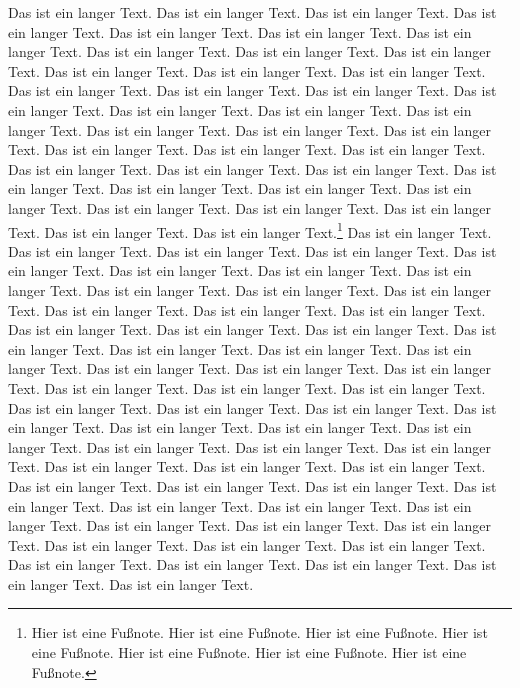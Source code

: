 \documentclass[twoside]{article}
\begin{document}
Das ist ein langer Text. Das ist ein langer Text.
Das ist ein langer Text. Das ist ein langer Text.
Das ist ein langer Text. Das ist ein langer Text.
Das ist ein langer Text. Das ist ein langer Text.
Das ist ein langer Text. Das ist ein langer Text.
Das ist ein langer Text. Das ist ein langer Text.
Das ist ein langer Text. Das ist ein langer Text.
Das ist ein langer Text. Das ist ein langer Text.
Das ist ein langer Text. Das ist ein langer Text.
Das ist ein langer Text. Das ist ein langer Text.
Das ist ein langer Text. Das ist ein langer Text.
Das ist ein langer Text. Das ist ein langer Text.
Das ist ein langer Text. Das ist ein langer Text.
Das ist ein langer Text. Das ist ein langer Text.
Das ist ein langer Text. Das ist ein langer Text.
Das ist ein langer Text. Das ist ein langer Text.
Das ist ein langer Text. Das ist ein langer Text.
Das ist ein langer Text. Das ist ein langer Text.
Das ist ein langer Text. Das ist ein langer Text.\footnote{%
  Hier ist eine Fu\ss note. Hier ist eine Fu\ss note.
  Hier ist eine Fu\ss note. Hier ist eine Fu\ss note.
  Hier ist eine Fu\ss note. Hier ist eine Fu\ss note.
  Hier ist eine Fu\ss note.}
Das ist ein langer Text. Das ist ein langer Text.
Das ist ein langer Text. Das ist ein langer Text.
Das ist ein langer Text. Das ist ein langer Text.
Das ist ein langer Text. Das ist ein langer Text.
Das ist ein langer Text. Das ist ein langer Text.
Das ist ein langer Text. Das ist ein langer Text.
Das ist ein langer Text. Das ist ein langer Text.
Das ist ein langer Text. Das ist ein langer Text.
Das ist ein langer Text. Das ist ein langer Text.
Das ist ein langer Text. Das ist ein langer Text.
Das ist ein langer Text. Das ist ein langer Text.
Das ist ein langer Text. Das ist ein langer Text.
Das ist ein langer Text. Das ist ein langer Text.
Das ist ein langer Text. Das ist ein langer Text.
Das ist ein langer Text. Das ist ein langer Text.
Das ist ein langer Text. Das ist ein langer Text.
Das ist ein langer Text. Das ist ein langer Text.
Das ist ein langer Text. Das ist ein langer Text.
Das ist ein langer Text. Das ist ein langer Text.
Das ist ein langer Text. Das ist ein langer Text.
Das ist ein langer Text. Das ist ein langer Text.
Das ist ein langer Text. Das ist ein langer Text.
Das ist ein langer Text. Das ist ein langer Text.
Das ist ein langer Text. Das ist ein langer Text.
Das ist ein langer Text. Das ist ein langer Text.
Das ist ein langer Text. Das ist ein langer Text.
Das ist ein langer Text. Das ist ein langer Text.
Das ist ein langer Text. Das ist ein langer Text.
Das ist ein langer Text. Das ist ein langer Text.
\end{document}
